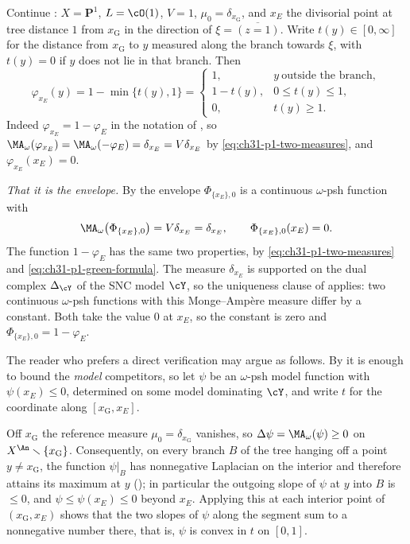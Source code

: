 \begin{example}
\label{ex:ch31-p1-green}
Continue : \(X=\mathbf P^1\), \(L=\cO(1)\),
\(V=1\), \(\mu_0=\delta_{x_{\mathrm G}}\), and \(x_E\) the divisorial point
at tree distance \(1\) from \(x_{\mathrm G}\) in the direction of
\(\xi=\overline{(z=1)}\).  Write \(t(y)\in[0,\infty]\) for the distance from
\(x_{\mathrm G}\) to \(y\) measured along the branch towards \(\xi\), with
\(t(y)=0\) if \(y\) does not lie in that branch.  Then
\begin{equation}
\label{eq:ch31-p1-green-formula}
 \varphi_{x_E}(y)=1-\min\{t(y),1\}
 =\begin{cases}
   1,&y\ \text{outside the branch},\\
   1-t(y),&0\leq t(y)\leq1,\\
   0,&t(y)\geq1 .
  \end{cases}
\end{equation}
Indeed \(\varphi_{x_E}=1-\varphi_E\) in the notation of
, so
\(\MA_\omega(\varphi_{x_E})=\MA_\omega(-\varphi_E)=\delta_{x_E}=V\delta_{x_E}\)
by \eqref{eq:ch31-p1-two-measures}, and \(\varphi_{x_E}(x_E)=0\).

\emph{That it is the envelope.}  By  the envelope
\(\Phi_{\{x_E\},0}\) is a continuous \(\omega\)-psh function with
\[
 \MA_\omega\bigl(\Phi_{\{x_E\},0}\bigr)=V\delta_{x_E}=\delta_{x_E},
 \qquad
 \Phi_{\{x_E\},0}(x_E)=0 .
\]
The function \(1-\varphi_E\) has the same two properties, by
\eqref{eq:ch31-p1-two-measures} and
\eqref{eq:ch31-p1-green-formula}.  The measure \(\delta_{x_E}\) is supported
on the dual complex \(\Delta_{\cY}\) of the SNC model \(\cY\), so the
uniqueness clause of  applies: two continuous
\(\omega\)-psh functions with this Monge--Amp\`ere measure differ by a
constant.  Both take the value \(0\) at \(x_E\), so the constant is zero and
\(\Phi_{\{x_E\},0}=1-\varphi_E\).

The reader who prefers a direct verification may argue as follows.  By
 it is enough to bound the
\emph{model} competitors, so let \(\psi\) be an \(\omega\)-psh model
function with \(\psi(x_E)\leq0\), determined on some model dominating
\(\cY\), and write \(t\) for the coordinate along
\([x_{\mathrm G},x_E]\).

Off \(x_{\mathrm G}\) the reference measure \(\mu_0=\delta_{x_{\mathrm G}}\)
vanishes, so \(\Delta\psi=\MA_\omega(\psi)\geq0\) on
\(X^{\An}\smallsetminus\{x_{\mathrm G}\}\).  Consequently, on every branch
\(B\) of the tree hanging off a point \(y\neq x_{\mathrm G}\), the function
\(\psi|_B\) has nonnegative Laplacian on the interior and therefore attains
its maximum at \(y\) (); in particular the
outgoing slope of \(\psi\) at \(y\) into \(B\) is \(\leq0\), and
\(\psi\leq\psi(x_E)\leq0\) beyond \(x_E\).  Applying this at each interior
point of \((x_{\mathrm G},x_E)\) shows that the two slopes of \(\psi\) along
the segment sum to a nonnegative number there, that is, \(\psi\) is convex
in \(t\) on \([0,1]\).


\end{example}
